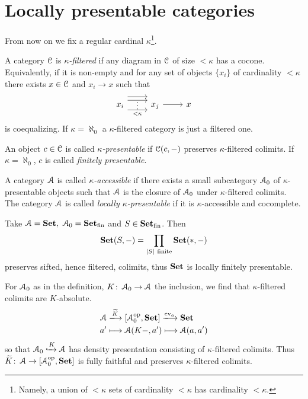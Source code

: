 \documentclass[a4paper,11pt,oneside,openany]{scrbook}
\begin{document}
\section{Locally presentable categories}
From now on we fix a regular cardinal $\kappa$\footnote{Namely, a union of
$<\kappa$ sets of cardinality $<\kappa$ has cardinality $<\kappa$.}.
\begin{defn}
	A category $\operatorname{\mathcal{C}}$ is \emph{$\kappa$-filtered} if any diagram in $\operatorname{\mathcal{C}}$ of size
    $<\kappa$ has a cocone. Equivalently, if it is non-empty and for any set of
    objects $\{x_i\}$ of cardinality $<\kappa$ there exists $x\in\operatorname{\mathcal{C}}$ and $x_i\to
    x$ such that
	\[
		\begin{tikzcd}
			x_i\arrow[r,shift left=2.2ex] \arrow[r,shift left=1.2ex,""{name=A}] \arrow[r, shift right=1.5ex,"<\kappa"',""{name=B}]\ar[from=A, to=B, phantom, "\vdots"]&x_j \arrow[r]&x
		\end{tikzcd}
	\]
	is coequalizing. If $\kappa=\aleph_0$ a $\kappa$-filtered category is just a
    filtered one.
\end{defn}
\begin{defn}
	An object $c\in\operatorname{\mathcal{C}}$ is called \emph{$\kappa$-presentable} if $\operatorname{\mathcal{C}}(c,-)$
    preserves $\kappa$-filtered colimits. If $\kappa=\aleph_0$, $c$ is called
    \emph{finitely presentable}.
\end{defn}
\begin{defn}
	A category $\operatorname{\mathcal{A}}$ is called \emph{$\kappa$-accessible} if there exists a small
    subcategory $\operatorname{\mathcal{A}}_0$ of $\kappa$-presentable objects such that $\operatorname{\mathcal{A}}$ is the
    closure of $\operatorname{\mathcal{A}}_0$ under $\kappa$-filtered colimits. The category $\operatorname{\mathcal{A}}$ is
    called \emph{locally $\kappa$-presentable} if it is $\kappa$-accessible and
    cocomplete.
\end{defn}
\begin{exmp}
	Take $\A=\Set,\ \A_0=\Set_\text{fin}$ and $S\in{\normalfont\textbf{Set}}_\text{fin}$. Then $$\Set(S,-)=\displaystyle\prod_{|S| \ \text{finite}}\Set(*,-)$$
	preserves sifted, hence filtered, colimits, thus ${\normalfont\textbf{Set}}$ is locally finitely
    presentable.
\end{exmp}
\begin{rmk}
	For $\operatorname{\mathcal{A}}_0$ as in the definition, $K\colon\operatorname{\mathcal{A}}_0\to\operatorname{\mathcal{A}}$ the inclusion, we find
    that $\kappa$-filtered colimits are $K$-absolute.
	\begin{align*}
		\A & \xlongrightarrow{\widetilde{K}}\left[\A_0^{\op},\Set\right]\xlongrightarrow{\text{ev}_a}\Set \\
		a' & \longmapsto\A(K-,a')\longmapsto\A(a,a')
	\end{align*}
	so that $\operatorname{\mathcal{A}}_0\xhookrightarrow{K}\operatorname{\mathcal{A}}$ has density presentation consisting of
    $\kappa$-filtered colimits. Thus
    $\widetilde{K}\colon\operatorname{\mathcal{A}}\to\left[\operatorname{\mathcal{A}}_0^{\operatorname{\text{op}}},{\normalfont\textbf{Set}}\right]$ is fully faithful and
    preserves $\kappa$-filtered colimits.
\end{rmk}
\end{document}

